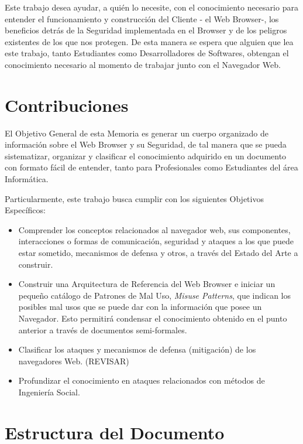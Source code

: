 Este trabajo desea ayudar, a quién lo necesite, con el conocimiento necesario para entender el funcionamiento y construcción del Cliente - el Web Browser-, los beneficios detrás de la Seguridad implementada en el Browser y de los peligros existentes de los que nos protegen. De esta manera se espera que alguien que lea este trabajo, tanto Estudiantes como Desarrolladores de Softwares, obtengan el conocimiento necesario al momento de trabajar junto con el Navegador Web. 



\section{Contribuciones}
\label{chap:contr}

El Objetivo General de esta Memoria es generar un cuerpo organizado de información sobre el Web Browser y su Seguridad, de tal manera que se pueda sistematizar, organizar y clasificar el conocimiento adquirido en un documento con formato fácil de entender, tanto para Profesionales como Estudiantes del área Informática. 

Particularmente, este trabajo busca cumplir con los siguientes Objetivos Específicos:

\begin{itemize}
	\item Comprender los conceptos relacionados al navegador web, sus componentes, interacciones o formas de comunicación, seguridad y ataques a los que puede estar sometido, mecanismos de defensa y otros, a través del Estado del Arte a construir.
	\item Construir una Arquitectura de Referencia del Web Browser e iniciar un pequeño catálogo de Patrones de Mal Uso, \textit{Misuse Patterns}, que indican los posibles mal usos que se puede dar con la información que posee un Navegador. Esto permitirá condensar el conocimiento obtenido en el punto anterior a través de documentos semi-formales.
	\item Clasificar los ataques y mecanismos de defensa (mitigación) de los navegadores Web. (REVISAR)
	\item Profundizar el conocimiento en ataques relacionados con métodos de Ingeniería Social.
	
\end{itemize} 


\section{Estructura del Documento}
\label{chap:estruct}

